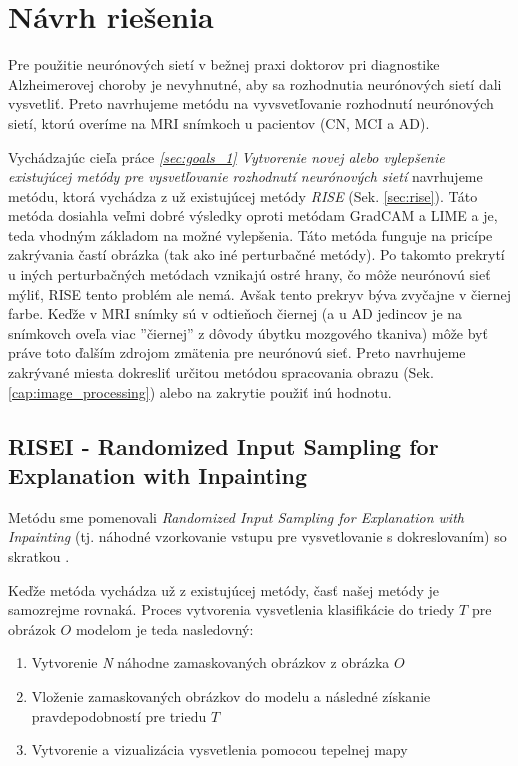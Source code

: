 \chapter{Návrh riešenia}

Pre použitie neurónových sietí v bežnej praxi doktorov pri diagnostike Alzheimerovej choroby je nevyhnutné, aby sa rozhodnutia neurónových sietí dali vysvetliť. Preto navrhujeme metódu na vyvsvetľovanie rozhodnutí neurónových sietí, ktorú overíme na MRI snímkoch u pacientov (CN, MCI a AD).

Vychádzajúc cieľa práce \textit{\ref{sec:goals_1} Vytvorenie novej alebo vylepšenie existujúcej metódy pre vysvetľovanie rozhodnutí neurónových sietí} navrhujeme metódu, ktorá vychádza z už existujúcej metódy \textit{RISE} (Sek. \ref{sec:rise}). Táto metóda dosiahla veľmi dobré výsledky oproti metódam GradCAM a LIME a je, teda vhodným základom na možné vylepšenia. Táto metóda funguje na pricípe zakrývania častí obrázka (tak ako iné perturbačné metódy). Po takomto prekrytí u iných perturbačných metódach vznikajú ostré hrany, čo môže neurónovú sieť mýliť, RISE tento problém ale nemá. Avšak tento prekryv býva zvyčajne v čiernej farbe. Keďže v MRI snímky sú v odtieňoch čiernej (a u AD jedincov je na snímkovch oveľa viac ''čiernej'' z dôvody úbytku mozgového tkaniva) môže byť práve toto ďalším zdrojom zmätenia pre neurónovú sieť. Preto navrhujeme zakrývané miesta dokresliť určitou metódou spracovania obrazu (Sek. \ref{cap:image_processing}) alebo na zakrytie použiť inú hodnotu.

\section{RISEI - Randomized Input Sampling for Explanation with Inpainting}

Metódu sme pomenovali \textit{Randomized Input Sampling for Explanation with Inpainting} (tj. náhodné vzorkovanie vstupu pre vysvetlovanie s dokreslovaním) so skratkou .

Keďže metóda vychádza už z existujúcej metódy, časť našej metódy je samozrejme rovnaká. Proces vytvorenia vysvetlenia klasifikácie do triedy $T$ pre obrázok $O$ modelom je teda nasledovný:

\begin{enumerate}
    \item Vytvorenie \textit{N} náhodne zamaskovaných obrázkov z obrázka $O$
    \item Vloženie zamaskovaných obrázkov do modelu a následné získanie pravdepodobností pre triedu $T$
    \item Vytvorenie a vizualizácia vysvetlenia pomocou tepelnej mapy
\end{enumerate}

